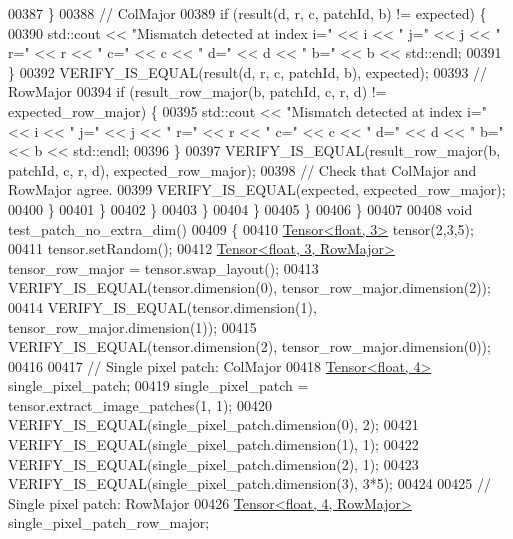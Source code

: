 \begin{DoxyCode}
00387               \}
00388               \textcolor{comment}{// ColMajor}
00389               \textcolor{keywordflow}{if} (result(d, r, c, patchId, b) != expected) \{
00390                 std::cout << \textcolor{stringliteral}{"Mismatch detected at index i="} << i << \textcolor{stringliteral}{" j="} << j << \textcolor{stringliteral}{" r="} << r << \textcolor{stringliteral}{" c="} << c
       << \textcolor{stringliteral}{" d="} << d << \textcolor{stringliteral}{" b="} << b << std::endl;
00391               \}
00392               VERIFY\_IS\_EQUAL(result(d, r, c, patchId, b), expected);
00393               \textcolor{comment}{// RowMajor}
00394               \textcolor{keywordflow}{if} (result\_row\_major(b, patchId, c, r, d) != expected\_row\_major) \{
00395                 std::cout << \textcolor{stringliteral}{"Mismatch detected at index i="} << i << \textcolor{stringliteral}{" j="} << j << \textcolor{stringliteral}{" r="} << r << \textcolor{stringliteral}{" c="} << c
       << \textcolor{stringliteral}{" d="} << d << \textcolor{stringliteral}{" b="} << b << std::endl;
00396               \}
00397               VERIFY\_IS\_EQUAL(result\_row\_major(b, patchId, c, r, d), expected\_row\_major);
00398               \textcolor{comment}{// Check that ColMajor and RowMajor agree.}
00399               VERIFY\_IS\_EQUAL(expected, expected\_row\_major);
00400             \}
00401           \}
00402         \}
00403       \}
00404     \}
00405   \}
00406 \}
00407 
00408 \textcolor{keywordtype}{void} test\_patch\_no\_extra\_dim()
00409 \{
00410   \hyperlink{class_eigen_1_1_tensor}{Tensor<float, 3>} tensor(2,3,5);
00411   tensor.setRandom();
00412   \hyperlink{class_eigen_1_1_tensor}{Tensor<float, 3, RowMajor>} tensor\_row\_major = tensor.swap\_layout();
00413   VERIFY\_IS\_EQUAL(tensor.dimension(0), tensor\_row\_major.dimension(2));
00414   VERIFY\_IS\_EQUAL(tensor.dimension(1), tensor\_row\_major.dimension(1));
00415   VERIFY\_IS\_EQUAL(tensor.dimension(2), tensor\_row\_major.dimension(0));
00416 
00417   \textcolor{comment}{// Single pixel patch: ColMajor}
00418   \hyperlink{class_eigen_1_1_tensor}{Tensor<float, 4>} single\_pixel\_patch;
00419   single\_pixel\_patch = tensor.extract\_image\_patches(1, 1);
00420   VERIFY\_IS\_EQUAL(single\_pixel\_patch.dimension(0), 2);
00421   VERIFY\_IS\_EQUAL(single\_pixel\_patch.dimension(1), 1);
00422   VERIFY\_IS\_EQUAL(single\_pixel\_patch.dimension(2), 1);
00423   VERIFY\_IS\_EQUAL(single\_pixel\_patch.dimension(3), 3*5);
00424 
00425   \textcolor{comment}{// Single pixel patch: RowMajor}
00426   \hyperlink{class_eigen_1_1_tensor}{Tensor<float, 4, RowMajor>} single\_pixel\_patch\_row\_major;

\end{DoxyCode}
